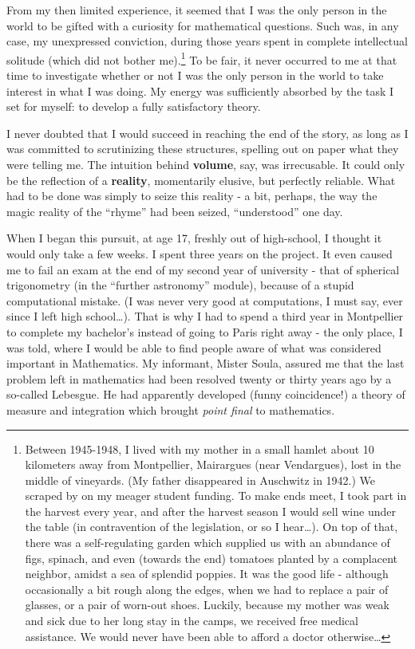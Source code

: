 From my then limited experience, it seemed that I was the only person in the world to be
gifted with a curiosity for mathematical questions. Such was, in any case, my unexpressed
conviction, during those years spent in complete intellectual solitude (which did not
bother me).\footnote{Between 1945-1948, I lived with my mother in a small hamlet about 10
kilometers away from Montpellier, Mairargues (near Vendargues), lost in the middle of
vineyards. (My father disappeared in Auschwitz in 1942.) We scraped by on my meager
student funding. To make ends meet, I took part in the harvest every year, and after the
harvest season I would sell wine under the table (in contravention of the legislation, or
so I hear\ldots). On top of that, there was a self-regulating garden which 
supplied us with an abundance of
figs, spinach, and
even (towards the end) tomatoes planted by a complacent neighbor,
amidst a sea of splendid poppies.
It was the good life - although occasionally a bit rough along the edges, when we had to
replace a pair of glasses, or a pair of worn-out shoes. Luckily, because my mother was
weak and sick due to her long stay in the camps, we received free medical assistance. We
would never have been able to afford a doctor otherwise\ldots}
To be fair, it never occurred to me at that time to investigate
whether or not I was the
only person in the world to take interest in what I was doing. 
My energy was sufficiently absorbed by the task I set for myself: to develop a fully
satisfactory theory.

I never doubted that I would succeed in reaching the end of the story, as long as I was
committed to scrutinizing these structures, spelling out on paper what they were telling
me. The intuition behind \textbf{volume}, say, was irrecusable. It could only be the
reflection of a \textbf{reality}, momentarily elusive, but perfectly reliable. What had to
be done was simply to seize this reality - a bit, perhaps, the way the magic reality of
the ``rhyme'' had been seized, ``understood'' one day. 

When I began this pursuit, at age 17, freshly out of high-school, I thought it would only
take a few weeks. 
I spent three years on the project. It even caused me to fail an exam at the end of my
second year of university - that of spherical trigonometry (in the ``further astronomy''
module), because of a stupid computational mistake.
(I was never very good at computations, I must say, ever since I left high school\ldots).
That is why I had to spend a third year in Montpellier to complete
my bachelor's instead of going to Paris right away - the only place, I was told, where I
would be able to find people aware of what was considered important in Mathematics.
My informant, Mister Soula, assured me that the last problem left in mathematics had been
resolved twenty or thirty years ago by a so-called Lebesgue. 
He had apparently developed (funny coincidence!) a theory of measure and integration which
brought \emph{point final} to mathematics. 

